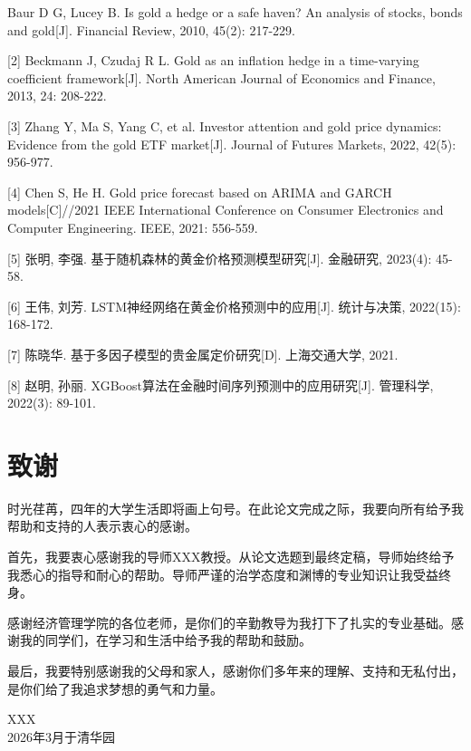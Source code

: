 \documentclass[UTF8,a4paper,12pt]{ctexart}
\begin{document}
\begin{flushleft}
[1] Baur D G, Lucey B. Is gold a hedge or a safe haven? An analysis of stocks, bonds and gold[J]. Financial Review, 2010, 45(2): 217-229.

\vspace{0.5em}

[2] Beckmann J, Czudaj R L. Gold as an inflation hedge in a time-varying coefficient framework[J]. North American Journal of Economics and Finance, 2013, 24: 208-222.

\vspace{0.5em}

[3] Zhang Y, Ma S, Yang C, et al. Investor attention and gold price dynamics: Evidence from the gold ETF market[J]. Journal of Futures Markets, 2022, 42(5): 956-977.

\vspace{0.5em}

[4] Chen S, He H. Gold price forecast based on ARIMA and GARCH models[C]//2021 IEEE International Conference on Consumer Electronics and Computer Engineering. IEEE, 2021: 556-559.

\vspace{0.5em}

[5] 张明, 李强. 基于随机森林的黄金价格预测模型研究[J]. 金融研究, 2023(4): 45-58.

\vspace{0.5em}

[6] 王伟, 刘芳. LSTM神经网络在黄金价格预测中的应用[J]. 统计与决策, 2022(15): 168-172.

\vspace{0.5em}

[7] 陈晓华. 基于多因子模型的贵金属定价研究[D]. 上海交通大学, 2021.

\vspace{0.5em}

[8] 赵明, 孙丽. XGBoost算法在金融时间序列预测中的应用研究[J]. 管理科学, 2022(3): 89-101.
\end{flushleft}

\newpage
\section*{致\quad 谢}

时光荏苒，四年的大学生活即将画上句号。在此论文完成之际，我要向所有给予我帮助和支持的人表示衷心的感谢。

首先，我要衷心感谢我的导师XXX教授。从论文选题到最终定稿，导师始终给予我悉心的指导和耐心的帮助。导师严谨的治学态度和渊博的专业知识让我受益终身。

感谢经济管理学院的各位老师，是你们的辛勤教导为我打下了扎实的专业基础。感谢我的同学们，在学习和生活中给予我的帮助和鼓励。

最后，我要特别感谢我的父母和家人，感谢你们多年来的理解、支持和无私付出，是你们给了我追求梦想的勇气和力量。

\vspace{2cm}

\begin{flushright}
XXX\\
2026年3月于清华园
\end{flushright}
\end{document}

